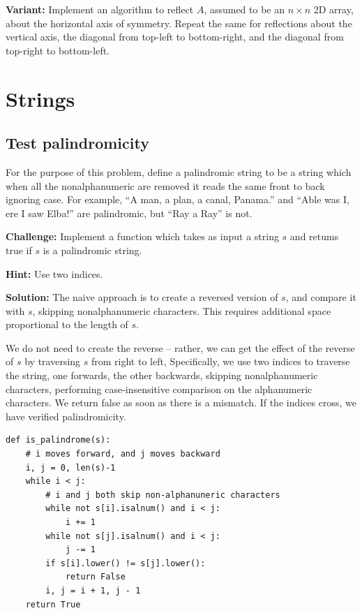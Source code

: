 \documentclass[11pt,a4paper]{article}
\begin{document}
\textbf{Variant:} Implement an algorithm to reflect $A$, assumed to be an
$n\times n$ 2D array, about the horizontal axis of symmetry. Repeat the same
for reflections about the vertical axis, the diagonal from top-left to
bottom-right, and the diagonal from top-right to bottom-left.

\section{Strings}

\subsection{Test palindromicity}

For the purpose of this problem, define a palindromic string to be a string
which when all the nonalphanumeric are removed it reads the same front to back
ignoring case. For example, ``A man, a plan, a canal, Panama.'' and ``Able was
I, ere I saw Elba!'' are palindromic, but ``Ray a Ray'' is not.

\textbf{Challenge:} Implement a function which takes as input a string $s$ and
retums true if $s$ is a palindromic string. 

\textbf{Hint:} Use two indices.

\textbf{Solution:} The naive approach is to create a reversed version of $s$,
and compare it with $s$, skipping nonalphanumeric characters. This requires
additional space proportional to the length of $s$.

We do not need to create the reverse -- rather, we can get the effect of the
reverse of $s$ by traversing $s$ from right to left, Specifically, we use two
indices to traverse the string, one forwards, the other backwards, skipping
nonalphanumeric characters, performing case-insensitive comparison on the
alphanumeric characters. We return false as soon as there is a mismatch. If
the indices cross, we have verified palindromicity.

\begin{verbatim}
def is_palindrome(s):
    # i moves forward, and j moves backward
    i, j = 0, len(s)-1 
    while i < j:
        # i and j both skip non-alphanuneric characters 
        while not s[i].isalnum() and i < j:
            i += 1
        while not s[j].isalnum() and i < j:
            j -= 1
        if s[i].lower() != s[j].lower():
            return False
        i, j = i + 1, j - 1
    return True  
\end{verbatim} 
\end{document}
